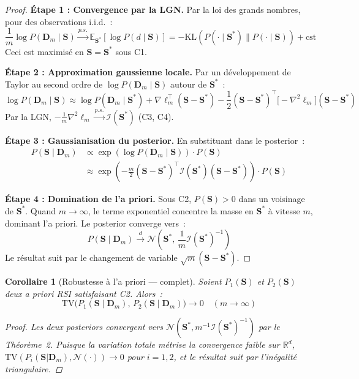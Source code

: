\documentclass[letterpaper]{article}
\newtheorem{corollaire}{Corollaire}[theoreme]
\begin{document}
\begin{proof}
\textbf{\'Etape 1 : Convergence par la LGN.}
Par la loi des grands nombres, pour des observations i.i.d.~:
\[
  \frac{1}{m} \log P(\mathbf{D}_m \mid \mathbf{S})
  \xrightarrow{p.s.} \mathbb{E}_{\mathbf{S}^*}[\log P(d \mid \mathbf{S})]
  = -\mathrm{KL}(P(\cdot \mid \mathbf{S}^*) \| P(\cdot \mid \mathbf{S}))
  + \text{cst}
\]
Ceci est maximis\'e en $\mathbf{S} = \mathbf{S}^*$ sous C1.

\textbf{\'Etape 2 : Approximation gaussienne locale.}
Par un d\'eveloppement de Taylor au second ordre de $\log P(\mathbf{D}_m
\mid \mathbf{S})$ autour de $\mathbf{S}^*$~:
\[
  \log P(\mathbf{D}_m \mid \mathbf{S}) \approx
  \log P(\mathbf{D}_m \mid \mathbf{S}^*)
  + \nabla \ell_m^\top (\mathbf{S} - \mathbf{S}^*)
  - \frac{1}{2}(\mathbf{S} - \mathbf{S}^*)^\top
  \bigl[-\nabla^2 \ell_m\bigr]
  (\mathbf{S} - \mathbf{S}^*)
\]
Par la LGN, $-\frac{1}{m}\nabla^2 \ell_m \xrightarrow{p.s.}
\mathcal{I}(\mathbf{S}^*)$ (C3, C4).

\textbf{\'Etape 3 : Gaussianisation du posterior.}
En substituant dans le posterior~:
\begin{align*}
  P(\mathbf{S} \mid \mathbf{D}_m)
  &\propto \exp\!\left(\log P(\mathbf{D}_m \mid \mathbf{S})\right)
  \cdot P(\mathbf{S}) \\
  &\approx \exp\!\left(-\frac{m}{2}(\mathbf{S}-\mathbf{S}^*)^\top
    \mathcal{I}(\mathbf{S}^*)
    (\mathbf{S}-\mathbf{S}^*)\right) \cdot P(\mathbf{S})
\end{align*}

\textbf{\'Etape 4 : Domination de l'a priori.}
Sous C2, $P(\mathbf{S}) > 0$ dans un voisinage de $\mathbf{S}^*$.
Quand $m \to \infty$, le terme exponentiel concentre la masse en
$\mathbf{S}^*$ \`a vitesse $m$, dominant l'a priori. Le posterior
converge vers~:
\[
  P(\mathbf{S} \mid \mathbf{D}_m)
  \xrightarrow{d} \mathcal{N}\!\left(\mathbf{S}^*,\,
  \frac{1}{m}\mathcal{I}(\mathbf{S}^*)^{-1}\right)
\]
Le r\'esultat suit par le changement de variable
$\sqrt{m}(\mathbf{S} - \mathbf{S}^*)$.
\end{proof}

\begin{corollaire}[Robustesse \`a l'a priori --- complet]
Soient $P_1(\mathbf{S})$ et $P_2(\mathbf{S})$ deux a priori RSI
satisfaisant C2. Alors~:
\[
  \mathrm{TV}\bigl(P_1(\mathbf{S} \mid \mathbf{D}_m),\,
  P_2(\mathbf{S} \mid \mathbf{D}_m)\bigr) \to 0
  \quad (m \to \infty)
\]
\begin{proof}
Les deux posteriors convergent vers
$\mathcal{N}(\mathbf{S}^*, m^{-1}\mathcal{I}(\mathbf{S}^*)^{-1})$
par le Th\'eor\`eme~2. Puisque la variation totale m\'etrise la
convergence faible sur $\mathbb{R}^d$, $\mathrm{TV}(P_i(\mathbf{S}
|\mathbf{D}_m), \mathcal{N}(\cdot)) \to 0$ pour $i = 1,2$, et le
r\'esultat suit par l'in\'egalit\'e triangulaire.
\end{proof}
\end{corollaire}
\end{document}
